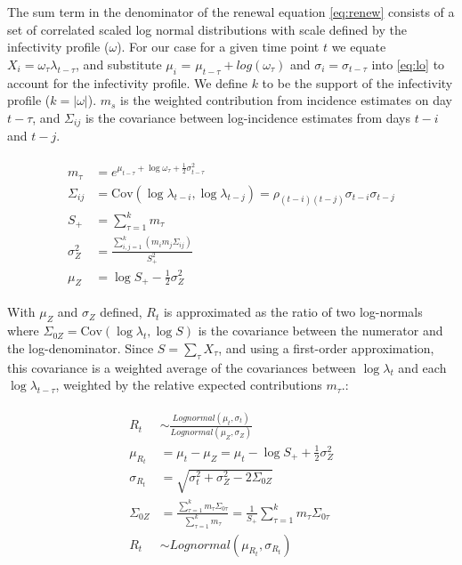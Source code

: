 \documentclass[10pt,letterpaper]{article}
\begin{document}
The sum term in the denominator of the renewal equation \eqref{eq:renew} consists of a set of correlated scaled log normal distributions with scale defined by the infectivity profile ($\omega$). For our case for a given time point $t$ we equate $X_i = \omega_{\tau} \lambda_{t-\tau}$, and substitute $\mu_i$ = $\mu_{t-\tau} + log(\omega_{\tau})$ and $\sigma_i = \sigma_{t-\tau}$ into \eqref{eq:lo} to account for the infectivity profile. We define $k$ to be the support of the infectivity profile ($k = |\omega|$). $m_{s}$ is the weighted contribution from incidence estimates on day $t-\tau$, and $\Sigma_{ij}$ is the covariance between log-incidence estimates from days $t-i$ and $t-j$.

\begin{eqnarray}
\begin{aligned}
	m_{\tau} &= e^{\mu_{t-\tau} + \log \omega_{\tau} + \frac{1}{2}\sigma_{t-\tau}^2 } \\
	\Sigma_{ij} &= \text{Cov}(\log \lambda_{t-i}, \log \lambda_{t-j}) = \rho_{(t-i)(t-j)} \sigma_{t-i} \sigma_{t-j} \\
	S_{+} &= \sum_{\tau=1}^k { m_{\tau} } \\
	\sigma_{Z}^2 &=
	  \frac{
	    \sum_{i,j=1}^k {
  	      (m_{i} m_{j} \Sigma_{ij})
	    }
	  }{S_{+}^2}	\\
	\mu_{Z} &= \log S_+ - \frac{1}{2}\sigma_{Z}^2
\end{aligned}
\end{eqnarray}

With $\mu_{Z}$ and $\sigma_{Z}$ defined, $R_t$ is approximated as the ratio of two log-normals where $\Sigma_{0Z} = \text{Cov}(\log \lambda_t, \log S)$ is the covariance between the numerator and the log-denominator. Since $S = \sum_\tau X_\tau$, and using a first-order approximation, this covariance is a weighted average of the covariances between $\log \lambda_t$ and each $\log \lambda_{t-\tau}$, weighted by the relative expected contributions $m_\tau$.:

\begin{eqnarray}
\label{eq:final}
\begin{aligned}
R_t &\sim \frac{Lognormal(\mu_t,\sigma_t)}
{Lognormal( \mu_{Z}, \sigma_{Z})} \\
\mu_{R_t} &= \mu_t - \mu_{Z} = \mu_t - \log S_+ + \frac{1}{2}\sigma_{Z}^2\\
\sigma_{R_t} &= \sqrt{\sigma_t^2+\sigma_{Z}^2 - 2 \Sigma_{0Z}} \\
\Sigma_{0Z} &= \frac{\sum_{\tau=1}^k m_\tau \Sigma_{0\tau}}{\sum_{\tau=1}^k m_\tau} = \frac{1}{S_+}\sum_{\tau=1}^k m_\tau \Sigma_{0\tau}\\
R_t &\sim Lognormal(\mu_{R_t}, \sigma_{R_t})
\end{aligned}
\end{eqnarray}
\end{document}
